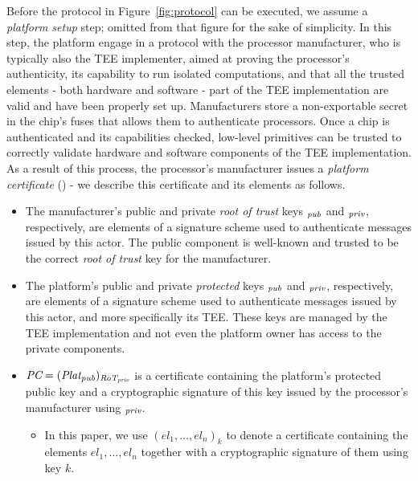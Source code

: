 Before the protocol in Figure~\ref{fig:protocol} can be executed, we assume a \emph{platform setup} step; omitted from that figure for the sake of simplicity. In this step, the platform engage in a protocol with the processor manufacturer, who is typically also the TEE implementer, aimed at proving the processor's authenticity, its capability to run isolated computations, and that all the trusted elements - both hardware and software - part of the TEE implementation are valid and have been properly set up. Manufacturers store a non-exportable secret in the chip's fuses that allows them to authenticate processors. Once a chip is authenticated and its capabilities checked, low-level primitives can be trusted to correctly validate hardware and software components of the TEE implementation. As a result of this process, the processor's manufacturer issues a \emph{platform certificate} (\PC{}) - we describe this certificate and its elements as follows.

\begin{itemize}[leftmargin=*]
	\item The manufacturer's public and private \emph{root of trust} keys \RoT{}$_{\textit{pub}{}}$ and \RoT{}$_{\textit{priv}{}}$, respectively, are elements of a signature scheme used to authenticate messages issued by this actor. The public component is well-known and trusted to be the correct \emph{root of trust} key for the manufacturer.
	
	\item The platform's public and private \emph{protected} keys \Plat{}$_{\textit{pub}{}}$ and \Plat{}$_{\textit{priv}{}}$, respectively, are elements of a signature scheme used to authenticate messages issued by this actor, and more specifically its TEE. These keys are managed by the TEE implementation and not even the platform owner has access to the private components.
	
	\item $\textit{PC}{} = (\textit{Plat}_{\textit{pub}{}})_{\textit{RoT}{}_{\textit{priv}{}}}$ is a certificate containing the platform's protected public key and a cryptographic signature of this key issued by the processor's manufacturer using \RoT{}$_{\textit{priv}{}}$. 
	
	\begin{itemize}
			\item In this paper, we use  $(el_1,\ldots,el_n)_{k}$ to denote a certificate containing the elements $el_1,\ldots,el_n$ together with a cryptographic signature of them using key $k$.
	\end{itemize}
\end{itemize}

